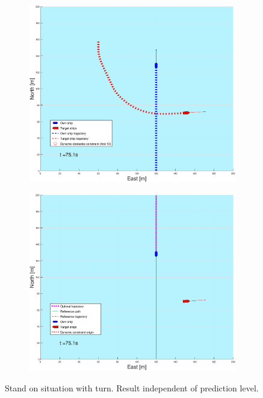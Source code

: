 \begin{figure}[ht!]
\begin{subfigure}[b]{0.499\textwidth}
    \end{subfigure}
    \hfill
    \\
    \begin{subfigure}[b]{0.49\textwidth}
        \centering
        \includegraphics[width=\textwidth]{Images/Figures/sving_SO/_Simple_0fig1_time=75}
    \end{subfigure}
    \hfill
    \begin{subfigure}[b]{0.499\textwidth}
        \centering
        \includegraphics[width=\textwidth]{Images/Figures/sving_SO/_Simple_0fig999_time=75}
    \end{subfigure}
    \hfill
    \caption{Stand on situation with turn. Result independent of prediction level.}
    \label{FIG: turn SO}
\end{figure}%
